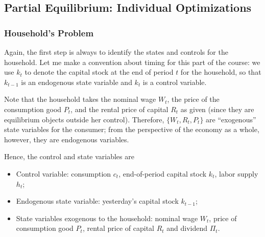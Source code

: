 \documentclass[12pt]{article}
\begin{document}
	\subsection{Partial Equilibrium: Individual Optimizations}
	\subsubsection{Household's Problem} 
	Again, the first step is always to identify the states and controls for the household. Let me make a convention about timing for this part of the course: we use $k_t$ to denote the capital stock at the end of period $t$ for the household, so that $k_{t-1}$ is an endogenous state variable and $k_t$ is a control variable. 
	
	Note that the household takes the nominal wage $W_t$, the price of the consumption good $P_t$, and the rental price of capital $R_t$ as given (since they are equilibrium objects outside her control). Therefore, $\{W_t, R_t, P_t\}$ are ``exogenous'' state variables for the consumer; from the perspective of the economy as a whole, however, they are endogenous variables. 
	
	Hence, the control and state variables are
	\begin{itemize}
		\item Control variable: consumption $c_t$, end-of-period capital stock $k_t$, labor supply $h_t$;
		\item Endogenous state variable: yesterday's capital stock $k_{t-1}$;
		\item State variables exogenous to the household: nominal wage $W_t$, price of consumption good $P_t$, rental price of capital $R_t$ and dividend $\Pi_t$.
	\end{itemize}
	
\end{document}
